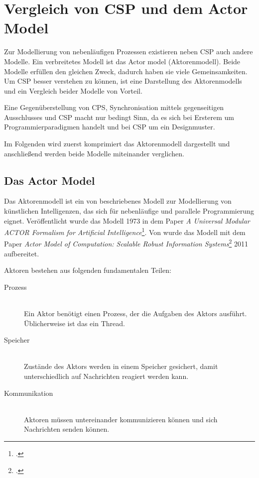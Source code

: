 \section{Vergleich von \acs{CSP} und dem Actor Model}

Zur Modellierung von nebenläufigen Prozessen existieren neben \ac{CSP} auch andere Modelle. Ein verbreitetes Modell ist das Actor model (Aktorenmodell). Beide Modelle erfüllen den gleichen Zweck, dadurch haben sie viele Gemeinsamkeiten. Um \ac{CSP} besser verstehen zu können, ist eine Darstellung des Aktorenmodells und ein Vergleich beider Modelle von Vorteil.

Eine Gegenüberstellung von \ac{CPS}, Synchronisation mittels gegenseitigen Ausschlusses und \ac{CSP} macht nur bedingt Sinn, da es sich bei Ersterem um Programmierparadigmen handelt und bei \ac{CSP} um ein Designmuster.

Im Folgenden wird zuerst komprimiert das Aktorenmodell dargestellt und anschließend werden beide Modelle miteinander verglichen.

\subsection{Das Actor Model}
Das Aktorenmodell ist ein von \citeauthor{ACTORS} beschriebenes Modell zur Modellierung von künstlichen Intelligenzen, das sich für nebenläufige und parallele Programmierung eignet. Veröffentlicht wurde das Modell 1973 in dem Paper \textit{A Universal Modular ACTOR Formalism for Artificial Intelligence}\footcite{ACTORS}. Von \citeauthor{ACTORSNEW} wurde das Modell mit dem Paper \textit{Actor Model of Computation: Scalable Robust Information Systems}\footcite{ACTORSNEW} 2011 aufbereitet. 

Aktoren bestehen aus folgenden fundamentalen Teilen:

\begin{description}
\item[Prozess]\hfill \\
Ein Aktor benötigt einen Prozess, der die Aufgaben des Aktors ausführt. Üblicherweise ist das ein Thread.
\item[Speicher]\hfill \\
Zustände des Aktors werden in einem Speicher gesichert, damit unterschiedlich auf Nachrichten reagiert werden kann.
\item[Kommunikation] \hfill \\
Aktoren müssen untereinander kommunizieren können und sich Nachrichten senden können.
\end{description}

